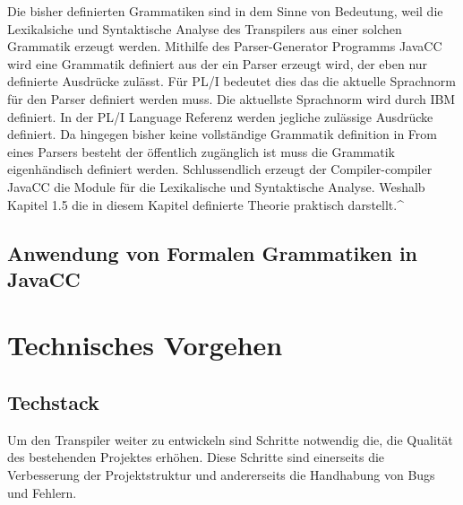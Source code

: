 Die bisher definierten Grammatiken sind in dem Sinne von Bedeutung, weil die Lexikalsiche und Syntaktische Analyse des Transpilers aus einer solchen Grammatik erzeugt werden. Mithilfe des Parser-Generator Programms JavaCC wird eine Grammatik definiert aus der ein Parser erzeugt wird, der eben nur definierte Ausdrücke zulässt. Für PL/I bedeutet dies das die aktuelle Sprachnorm für den Parser definiert werden muss. Die aktuellste Sprachnorm wird durch IBM definiert. In der PL/I Language Referenz werden jegliche zulässige Ausdrücke definiert. Da hingegen bisher keine vollständige Grammatik definition in From eines Parsers besteht der öffentlich zugänglich ist muss die Grammatik eigenhändisch definiert werden. Schlussendlich erzeugt der Compiler-compiler JavaCC die Module für die Lexikalische und Syntaktische Analyse. Weshalb Kapitel 1.5 die in diesem Kapitel definierte Theorie praktisch darstellt.^
     
	\subsection{Anwendung von Formalen Grammatiken in JavaCC}


\section{Technisches Vorgehen}
\subsection{Techstack}
Um den Transpiler weiter zu entwickeln sind Schritte notwendig die, die Qualität des bestehenden Projektes erhöhen. Diese Schritte sind einerseits die Verbesserung der Projektstruktur und andererseits die Handhabung von Bugs und Fehlern.

